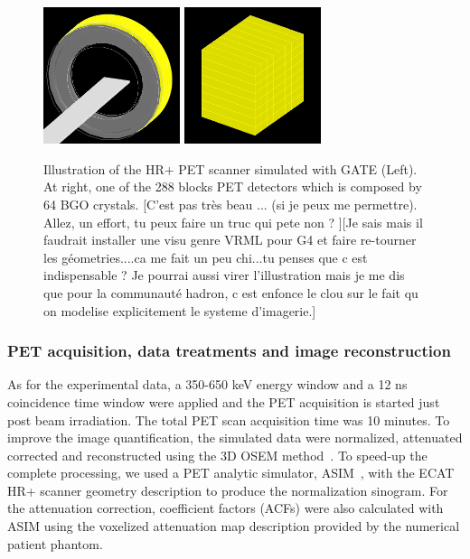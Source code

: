 \documentclass[11pt]{iopart}
\newcommand{\dsnote}[1]{{\color{green}[#1]}}
\newcommand{\sjnote}[1]{{\color{red}[#1]}}
\begin{document}
\begin{figure}[!h]
\centering
\includegraphics[width=40mm,height=40mm]{figures/HR_Simu_Gate_GC.jpg}
\includegraphics[width=40mm,height=40mm]{figures/bloc_detec_HR.jpg}
\caption{Illustration of the HR+ PET scanner simulated with GATE
  (Left). At right, one of the 288 blocks PET detectors which is
  composed by 64 BGO crystals. \dsnote{C'est pas très beau ... (si je
    peux me permettre). Allez, un effort, tu peux faire un truc qui
    pete non ? }\sjnote{Je sais mais il faudrait installer une visu genre VRML pour G4 et faire re-tourner les géometries....ca me fait un peu chi...tu penses que c est indispensable ? Je pourrai aussi virer l'illustration mais je me dis que pour la communauté hadron, c est enfonce le clou sur le fait qu on modelise explicitement le systeme d'imagerie.}}
\label{fig:fig0}
\end{figure}

\subsubsection{PET acquisition, data treatments and image reconstruction}

As for the experimental data, a 350-650 keV energy window and a 12 ns coincidence
time window were applied and the PET acquisition is started just post beam irradiation. The total PET scan acquisition time was 10 minutes. 
To improve the image quantification, the simulated data were
normalized, attenuated corrected and reconstructed using the 3D OSEM
method~\cite{OSEM_ref}. To speed-up the complete processing, we used a
PET analytic simulator, ASIM~\cite{Comtat1999}, with the ECAT HR+
scanner geometry description to produce the normalization
sinogram. For the attenuation correction, coefficient factors (ACFs)
were also calculated with ASIM using the voxelized attenuation map
description provided by the numerical patient phantom.
\end{document}

